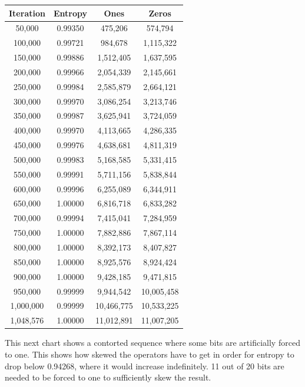\documentclass[letterpaper]{article}
\begin{document}
\begin{multicols}{2}
\begin{center}
\begin{tabular}{|c|c|c|c|}
\hline
\textbf{Iteration} & \textbf{Entropy} & \textbf{Ones} & \textbf{Zeros} \\
\hline
50,000 & 0.99350 & 475,206 & 574,794 \\
100,000 & 0.99721 & 984,678 & 1,115,322 \\
150,000 & 0.99886 & 1,512,405 & 1,637,595 \\
200,000 & 0.99966 & 2,054,339 & 2,145,661 \\
250,000 & 0.99984 & 2,585,879 & 2,664,121 \\
300,000 & 0.99970 & 3,086,254 & 3,213,746 \\
350,000 & 0.99987 & 3,625,941 & 3,724,059 \\
400,000 & 0.99970 & 4,113,665 & 4,286,335 \\
450,000 & 0.99976 & 4,638,681 & 4,811,319 \\
500,000 & 0.99983 & 5,168,585 & 5,331,415 \\
550,000 & 0.99991 & 5,711,156 & 5,838,844 \\
600,000 & 0.99996 & 6,255,089 & 6,344,911 \\
650,000 & 1.00000 & 6,816,718 & 6,833,282 \\
700,000 & 0.99994 & 7,415,041 & 7,284,959 \\
750,000 & 1.00000 & 7,882,886 & 7,867,114 \\
800,000 & 1.00000 & 8,392,173 & 8,407,827 \\
850,000 & 1.00000 & 8,925,576 & 8,924,424 \\
900,000 & 1.00000 & 9,428,185 & 9,471,815 \\
950,000 & 0.99999 & 9,944,542 & 10,005,458 \\
1,000,000 & 0.99999 & 10,466,775 & 10,533,225 \\
1,048,576 & 1.00000 & 11,012,891 & 11,007,205 \\
\hline
\end{tabular}
\end{center}

This next chart shows a contorted sequence where some bits are artificially forced to one. This shows how skewed the operators have to get in order for entropy to drop below 0.94268, where it would increase indefinitely. 11 out of 20 bits are needed to be forced to one to sufficiently skew the result.


\end{multicols}
\end{document}
